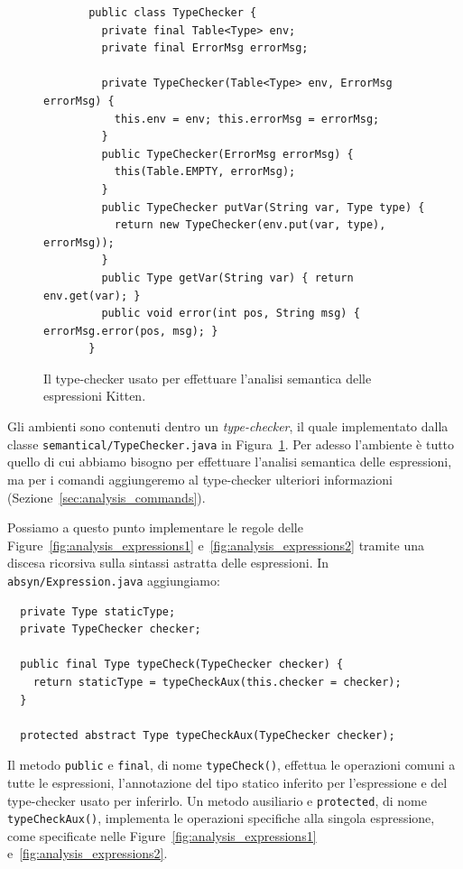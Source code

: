 \begin{figure}[t]
{\small
\begin{verbatim}
       public class TypeChecker {
         private final Table<Type> env;
         private final ErrorMsg errorMsg;

         private TypeChecker(Table<Type> env, ErrorMsg errorMsg) {
           this.env = env; this.errorMsg = errorMsg;
         }
         public TypeChecker(ErrorMsg errorMsg) {
           this(Table.EMPTY, errorMsg);
         }
         public TypeChecker putVar(String var, Type type) {
           return new TypeChecker(env.put(var, type), errorMsg));
         }
         public Type getVar(String var) { return env.get(var); }
         public void error(int pos, String msg) { errorMsg.error(pos, msg); }
       }
\end{verbatim}
}
\caption{Il type-checker usato per effettuare l'analisi semantica delle espressioni Kitten.}
  \label{fig:semantical.TypeChecker1}
\end{figure}
%
Gli ambienti sono contenuti dentro un \emph{type-checker}, il quale
\e implementato dalla classe \texttt{semantical/TypeChecker.java}
in Figura~\ref{fig:semantical.TypeChecker1}.
Per adesso l'ambiente \`e tutto quello di cui abbiamo bisogno per
effettuare l'analisi semantica delle espressioni,
ma per i comandi aggiungeremo al type-checker ulteriori informazioni
(Sezione~\ref{sec:analysis_commands}).

Possiamo a questo punto implementare le regole
delle Figure~\ref{fig:analysis_expressions1} e~\ref{fig:analysis_expressions2}
tramite una discesa ricorsiva sulla sintassi astratta delle espressioni. In
\texttt{absyn/Expression.java} aggiungiamo:
%
\begin{verbatim}
  private Type staticType;
  private TypeChecker checker;

  public final Type typeCheck(TypeChecker checker) {
    return staticType = typeCheckAux(this.checker = checker);
  }

  protected abstract Type typeCheckAux(TypeChecker checker);
\end{verbatim}
%
Il metodo \texttt{public} e \texttt{final}, di nome \texttt{typeCheck()},
effettua le operazioni comuni a tutte le espressioni, \cioe
l'annotazione del tipo statico inferito per l'espressione e del type-checker
usato per inferirlo. Un metodo ausiliario e \texttt{protected}, di nome
\texttt{typeCheckAux()}, implementa le operazioni specifiche alla singola
espressione, come specificate nelle Figure~\ref{fig:analysis_expressions1}
e~\ref{fig:analysis_expressions2}.

